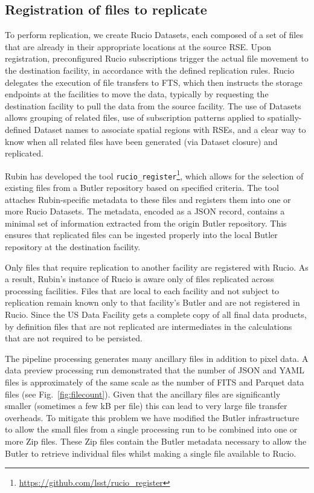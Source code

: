 \documentclass{webofc}
\begin{document}
\subsection{Registration of files to replicate}
\label{registration}

To perform replication, we create Rucio Datasets, each composed of a set of files that are already in their appropriate locations at the source RSE. Upon registration, preconfigured Rucio subscriptions trigger the actual file movement to the destination facility, in accordance with the defined replication rules. Rucio delegates the execution of file transfers to FTS, which then instructs the storage endpoints at the facilities to move the data, typically by requesting the destination facility to pull the data from the source facility. The use of Datasets allows grouping of related files, use of subscription patterns applied to spatially-defined Dataset names to associate spatial regions with RSEs, and a clear way to know when all related files have been generated (via Dataset closure) and replicated.

Rubin has developed the tool \texttt{rucio\_register}\footnote{\url{https://github.com/lsst/rucio_register}}, which allows for the selection of existing files from a Butler repository based on specified criteria. The tool attaches Rubin-specific metadata to these files and registers them into one or more Rucio Datasets. The metadata, encoded as a JSON record, contains a minimal set of information extracted from the origin Butler repository. This ensures that replicated files can be ingested properly into the local Butler repository at the destination facility.

Only files that require replication to another facility are registered with Rucio. As a result, Rubin's instance of Rucio is aware only of files replicated across processing facilities. Files that are local to each facility and not subject to replication remain known only to that facility's Butler and are not registered in Rucio. Since the US Data Facility gets a complete copy of all final data products, by definition files that are not replicated are intermediates in the calculations that are not required to be persisted.

The pipeline processing generates many ancillary files in addition to pixel data.
A data preview processing run \cite{10.1051/epjconf/20242950404} demonstrated that the number of JSON and YAML files is approximately of the same scale as the number of FITS and Parquet data files (see Fig.\ \ref{fig:filecount}).
Given that the ancillary files are significantly smaller (sometimes a few kB per file) this can lead to very large file transfer overheads.
To mitigate this problem we have modified the Butler infrastructure to allow the small files from a single processing run to be combined into one or more Zip files.
These Zip files contain the Butler metadata necessary to allow the Butler to retrieve individual files whilst making a single file available to Rucio.
\end{document}
